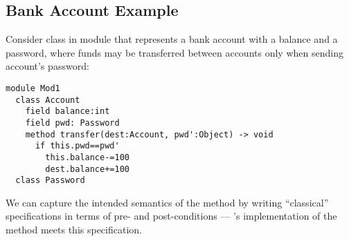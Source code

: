  
 

\subsection{Bank Account Example}
\label{s:bank}
  
Consider  class in module 
that represents a bank account
with a balance and a password, where funds may be transferred
between accounts only when sending  account's password:
%
%
%
%
% 
\begin{lstlisting}[language=Chainmail, frame=lines]
module Mod1
  class Account
    field balance:int 
    field pwd: Password
    method transfer(dest:Account, pwd':Object) -> void
      if this.pwd==pwd'
        this.balance-=100
        dest.balance+=100
  class Password
\end{lstlisting}
%
\noindent 
We can capture the intended
semantics of the  method by writing ``classical''
specifications in terms of pre- and post-conditions ---
's implementation of the  method meets
this specification.



